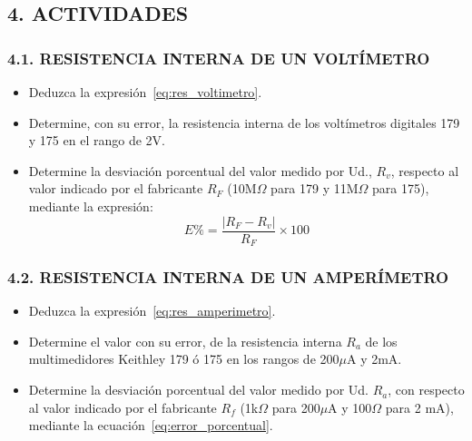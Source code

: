 \documentclass[12pt, a4paper]{article}
\begin{document}
\subsection*{4. ACTIVIDADES}
\subsubsection*{4.1. RESISTENCIA INTERNA DE UN VOLTÍMETRO}
\begin{itemize}
    \item Deduzca la expresión~\eqref{eq:res_voltimetro}.
    \item Determine, con su error, la resistencia interna de los voltímetros digitales 179 y 175 en el rango de 2V.
    \item Determine la desviación porcentual del valor medido por Ud., $R_v$, respecto al valor indicado por el fabricante 
    $R_F$ (10M$\Omega$ para 179 y 11M$\Omega$ para 175), mediante la expresión:
    \begin{equation}
        E\% = \frac{|R_F - R_v|}{R_F} \times 100
        \label{eq:error_porcentual}
    \end{equation}
\end{itemize}

\subsubsection*{4.2. RESISTENCIA INTERNA DE UN AMPERÍMETRO}
\begin{itemize}
    \item Deduzca la expresión~\eqref{eq:res_amperimetro}.
    \item Determine el valor con su error, de la resistencia interna $R_a$ de los multimedidores Keithley 179 ó 175 en 
    los rangos de 200$\mu$A y 2mA.
    \item Determine la desviación porcentual del valor medido por Ud. $R_a$, con respecto al valor indicado por el 
    fabricante $R_f$ (1k$\Omega$ para 200$\mu$A y 100$\Omega$ para 2 mA), mediante la ecuación~\eqref{eq:error_porcentual}.
\end{itemize}
\end{document}
